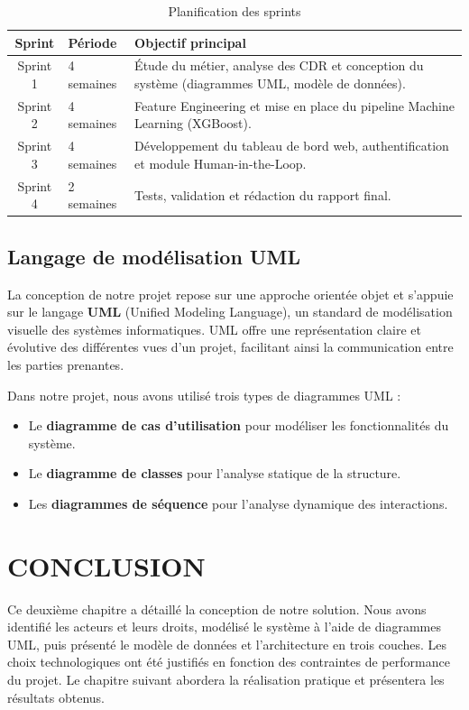 \documentclass[12pt, oneside, a4paper]{report}
\begin{document}
\begin{table}[H]
\centering
\caption{Planification des sprints}
\label{tab:sprints}
\vspace{0.3cm}
\renewcommand{\arraystretch}{1.3}
\begin{tabular}{|c|p{5cm}|p{5cm}|}
\hline
\textbf{Sprint} & \textbf{Période} & \textbf{Objectif principal} \\
\hline
Sprint 1 & 4 semaines & Étude du métier, analyse des CDR et conception du système (diagrammes UML, modèle de données). \\
\hline
Sprint 2 & 4 semaines & Feature Engineering et mise en place du pipeline Machine Learning (XGBoost). \\
\hline
Sprint 3 & 4 semaines & Développement du tableau de bord web, authentification et module Human-in-the-Loop. \\
\hline
Sprint 4 & 2 semaines & Tests, validation et rédaction du rapport final. \\
\hline
\end{tabular}
\end{table}

\subsection{Langage de modélisation UML}
La conception de notre projet repose sur une approche orientée objet et s'appuie sur le langage \textbf{UML} (Unified Modeling Language), un standard de modélisation visuelle des systèmes informatiques. UML offre une représentation claire et évolutive des différentes vues d'un projet, facilitant ainsi la communication entre les parties prenantes.

Dans notre projet, nous avons utilisé trois types de diagrammes UML :
\begin{itemize}
    \item Le \textbf{diagramme de cas d'utilisation} pour modéliser les fonctionnalités du système.
    \item Le \textbf{diagramme de classes} pour l'analyse statique de la structure.
    \item Les \textbf{diagrammes de séquence} pour l'analyse dynamique des interactions.
\end{itemize}
\section{CONCLUSION}
Ce deuxième chapitre a détaillé la conception de notre solution. Nous avons identifié les acteurs et leurs droits, modélisé le système à l’aide de diagrammes UML, puis présenté le modèle de données et l’architecture en trois couches. Les choix technologiques ont été justifiés en fonction des contraintes de performance du projet. Le chapitre suivant abordera la réalisation pratique et présentera les résultats obtenus.
\end{document}
